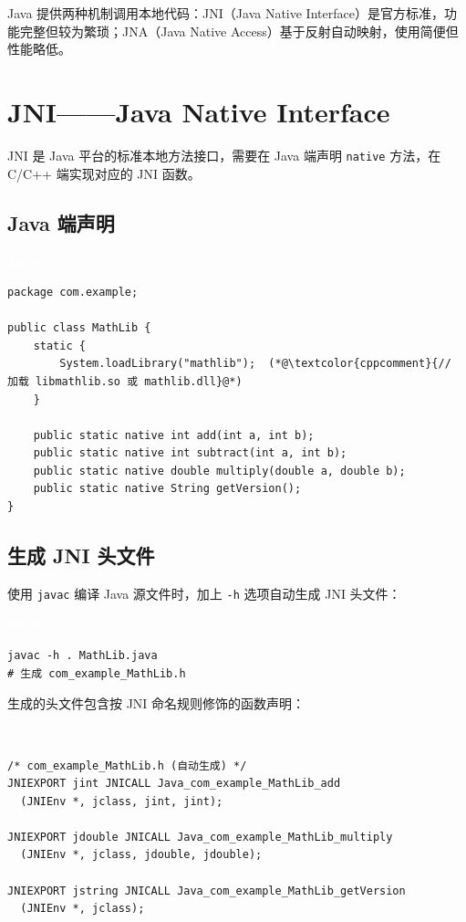 \documentclass[12pt,a4paper,fontset=fandol]{ctexbook}
\newcommand{\clabel}{%
  \begin{tcolorbox}[enhanced,colback=cheadbg,colframe=cheadbg,
    arc=1mm,boxrule=0mm,left=6pt,right=6pt,top=2pt,bottom=2pt,
    halign=left,oversize]
    \textcolor{white}{\small\bfseries C}
  \end{tcolorbox}\vspace{-4pt}}
\newcommand{\javalabel}{%
  \begin{tcolorbox}[enhanced,colback=javaheadbg,colframe=javaheadbg,
    arc=1mm,boxrule=0mm,left=6pt,right=6pt,top=2pt,bottom=2pt,
    halign=left,oversize]
    \textcolor{white}{\small\bfseries Java}
  \end{tcolorbox}\vspace{-4pt}}
\newcommand{\bashlabel}{%
  \begin{tcolorbox}[enhanced,colback=black!80,colframe=black!80,
    arc=1mm,boxrule=0mm,left=6pt,right=6pt,top=2pt,bottom=2pt,
    halign=left,oversize]
    \textcolor{white}{\small\bfseries Shell}
  \end{tcolorbox}\vspace{-4pt}}
\newcommand{\cpp}[1]{C++#1}
\begin{document}
Java 提供两种机制调用本地代码：JNI（Java Native Interface）是官方标准，功能完整但较为繁琐；JNA（Java Native Access）基于反射自动映射，使用简便但性能略低。

\section{JNI——Java Native Interface}

JNI 是 Java 平台的标准本地方法接口，需要在 Java 端声明 \texttt{native} 方法，在 C/\allowbreak{}\cpp{} 端实现对应的 JNI 函数。

\subsection{Java 端声明}
\javalabel
\begin{lstlisting}[style=javastyle]
package com.example;

public class MathLib {
    static {
        System.loadLibrary("mathlib");  (*@\textcolor{cppcomment}{// 加载 libmathlib.so 或 mathlib.dll}@*)
    }

    public static native int add(int a, int b);
    public static native int subtract(int a, int b);
    public static native double multiply(double a, double b);
    public static native String getVersion();
}
\end{lstlisting}

\subsection{生成 JNI 头文件}

使用 \texttt{javac} 编译 Java 源文件时，加上 \texttt{-h} 选项自动生成 JNI 头文件：

\bashlabel
\begin{lstlisting}[style=bashstyle]
javac -h . MathLib.java
# 生成 com_example_MathLib.h
\end{lstlisting}

生成的头文件包含按 JNI 命名规则修饰的函数声明：

\clabel
\begin{lstlisting}[style=cstyle]
/* com_example_MathLib.h (自动生成) */
JNIEXPORT jint JNICALL Java_com_example_MathLib_add
  (JNIEnv *, jclass, jint, jint);

JNIEXPORT jdouble JNICALL Java_com_example_MathLib_multiply
  (JNIEnv *, jclass, jdouble, jdouble);

JNIEXPORT jstring JNICALL Java_com_example_MathLib_getVersion
  (JNIEnv *, jclass);
\end{lstlisting}
\end{document}
